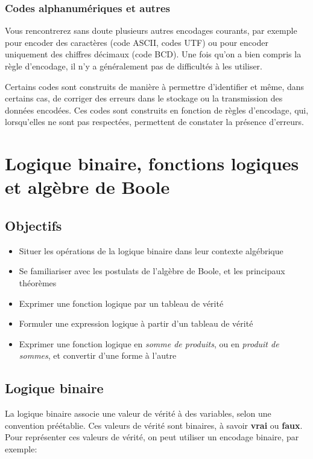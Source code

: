 \documentclass[11pt]{article}
\begin{document}
\subsubsection{Codes alphanumériques et autres}
\label{sec:orgb736de5}

Vous rencontrerez sans doute plusieurs autres encodages courants,
par exemple pour encoder des caractères (code ASCII, codes UTF)
ou pour encoder uniquement des chiffres décimaux (code BCD). Une fois
qu'on a bien compris la règle d'encodage, il n'y a généralement pas de
difficultés à les utiliser.

Certains codes sont construits de manière à permettre d'identifier et
même, dans certains cas, de corriger des erreurs dans le stockage ou
la transmission des données encodées. Ces codes sont construits en
fonction de règles d'encodage, qui, lorsqu'elles ne sont pas
respectées, permettent de constater la présence d'erreurs.

\section{Logique binaire, fonctions logiques et algèbre de Boole}
\label{sec:orge2e74db}


\subsection{Objectifs}
\label{sec:org7db96db}
\begin{itemize}
\item Situer les opérations de la logique binaire dans leur contexte algébrique
\item Se familiariser avec les postulats de l'algèbre de Boole, et les
principaux théorèmes
\item Exprimer une fonction logique par un tableau de vérité
\item Formuler une expression logique à partir d'un tableau de vérité
\item Exprimer une fonction logique en \emph{somme de produits}, ou en
\emph{produit de sommes}, et convertir d'une forme à l'autre
\end{itemize}

\subsection{Logique binaire}
\label{sec:orgcf58da8}

La logique binaire associe une valeur de vérité à des variables, selon
une convention préétablie. Ces valeurs de vérité sont binaires, à
savoir \textbf{vrai} ou \textbf{faux}. Pour représenter ces valeurs de vérité, on
peut utiliser un encodage binaire, par exemple:
\end{document}
